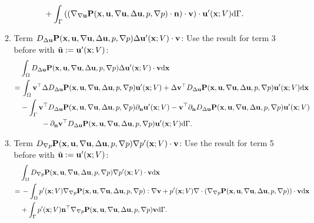 \documentclass[oneside]{book}
\numberwithin{equation}{section}
\begin{document}
\begin{enumerate}[leftmargin=0in]
\begin{enumerate}[leftmargin=0in]
\begin{align*}
            &+ \int_\Gamma \left(\left(\nabla_{\nabla{\bf u}}{\bf P}({\bf x},{\bf u},\nabla{\bf u},\Delta{\bf u},p,\nabla p)\cdot{\bf n}\right)\cdot{\bf v}\right)\cdot{\bf u}'({\bf x};V){\rm d}\Gamma.
        \end{align*}
        \item Term $D_{\Delta{\bf u}}{\bf P}({\bf x},{\bf u},\nabla{\bf u},\Delta{\bf u},p,\nabla p)\Delta{\bf u}'({\bf x};V)\cdot{\bf v}$: Use the result for term 3 before with $\tilde{\bf u} := {\bf u}'({\bf x};V)$:
        \begin{align*}
            &\int_\Omega D_{\Delta{\bf u}}{\bf P}({\bf x},{\bf u},\nabla{\bf u},\Delta{\bf u},p,\nabla p)\Delta{\bf u}'({\bf x};V)\cdot{\bf v}{\rm d}{\bf x}\\
            =&\, \int_\Omega {\bf v}^\top\Delta D_{\Delta{\bf u}}{\bf P}({\bf x},{\bf u},\nabla{\bf u},\Delta{\bf u},p,\nabla p){\bf u}'({\bf x};V) + \Delta{\bf v}^\top D_{\Delta{\bf u}}{\bf P}({\bf x},{\bf u},\nabla{\bf u},\Delta{\bf u},p,\nabla p){\bf u}'({\bf x};V){\rm d}{\bf x}\\
            &- \int_\Gamma {\bf v}^\top D_{\Delta{\bf u}}{\bf P}({\bf x},{\bf u},\nabla{\bf u},\Delta{\bf u},p,\nabla p)\partial_{\bf n}{\bf u}'({\bf x};V) - {\bf v}^\top\partial_{\bf n}D_{\Delta{\bf u}}{\bf P}({\bf x},{\bf u},\nabla{\bf u},\Delta{\bf u},p,\nabla p){\bf u}'({\bf x};V)\\
            &\hspace{1cm}- \partial_{\bf n}{\bf v}^\top D_{\Delta{\bf u}}{\bf P}({\bf x},{\bf u},\nabla{\bf u},\Delta{\bf u},p,\nabla p){\bf u}'({\bf x};V){\rm d}\Gamma.
        \end{align*}
        \item Term $D_{\nabla p}{\bf P}({\bf x},{\bf u},\nabla{\bf u},\Delta{\bf u},p,\nabla p)\nabla p'({\bf x};V)\cdot{\bf v}$: Use the result for term 5 before with $\tilde{\bf u} := {\bf u}'({\bf x};V)$:
        \begin{align*}
            &\int_\Omega D_{\nabla p}{\bf P}({\bf x},{\bf u},\nabla{\bf u},\Delta{\bf u},p,\nabla p)\nabla p'({\bf x};V)\cdot{\bf v}{\rm d}{\bf x}\\
            =&\, -\int_\Omega p'({\bf x};V)\nabla_{\nabla p}{\bf P}({\bf x},{\bf u},\nabla{\bf u},\Delta{\bf u},p,\nabla p):\nabla{\bf v} + p'({\bf x};V)\nabla\cdot\left(\nabla_{\nabla p}{\bf P}({\bf x},{\bf u},\nabla{\bf u},\Delta{\bf u},p,\nabla p)\right)\cdot{\bf v}{\rm d}{\bf x}\\
            &+ \int_\Gamma p'({\bf x};V){\bf n}^\top\nabla_{\nabla p}{\bf P}({\bf x},{\bf u},\nabla{\bf u},\Delta{\bf u},p,\nabla p){\bf v}{\rm d}\Gamma.

\end{align*}
\end{enumerate}
\end{enumerate}
\end{document}
